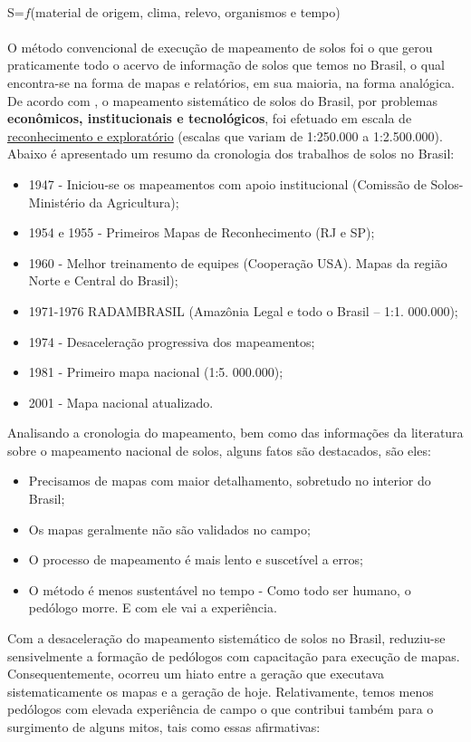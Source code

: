 \\
S=$f$(material de origem, clima, relevo, organismos e tempo)\\
\\
O método convencional de execução de mapeamento de solos foi o que gerou praticamente todo o acervo de informação de solos que temos no Brasil, o qual encontra-se na forma de mapas e relatórios, em sua maioria, na forma analógica.\\
De acordo com \cite{Mendonca-SantosEtAl:2007}, o mapeamento sistemático de solos do Brasil, por problemas \textbf{econômicos, institucionais e tecnológicos}, foi efetuado em escala de \underline{reconhecimento e exploratório} (escalas que variam de 1:250.000 a 1:2.500.000). Abaixo é apresentado um resumo da cronologia dos trabalhos de solos no Brasil:
\begin{itemize}
\item 1947 - Iniciou-se os mapeamentos com apoio institucional (Comissão de Solos- Ministério da Agricultura);
\item 1954 e 1955 - Primeiros Mapas de Reconhecimento (RJ e SP);
\item 1960 - Melhor treinamento de equipes (Cooperação USA). Mapas da região Norte e Central do Brasil);
\item 1971-1976 RADAMBRASIL (Amazônia Legal e todo o Brasil -- 1:1. 000.000);
\item 1974 - Desaceleração progressiva dos mapeamentos;
\item 1981 - Primeiro mapa nacional (1:5. 000.000);
\item 2001 - Mapa nacional atualizado.
\end{itemize}
Analisando a cronologia do mapeamento, bem como das informações da literatura sobre o mapeamento nacional de solos, alguns fatos são destacados, são eles: \begin{itemize}
\item Precisamos de mapas com maior detalhamento, sobretudo no interior do Brasil;
\item Os mapas geralmente não são validados no campo;
\item O processo de mapeamento é mais lento e suscetível a erros;
\item O método é menos sustentável no tempo - Como todo ser humano, o pedólogo morre. E com ele vai a experiência.
\end{itemize}
Com a desaceleração do mapeamento sistemático de solos no Brasil, reduziu-se sensivelmente a formação de pedólogos com capacitação para execução de mapas. Consequentemente, ocorreu um hiato entre a geração que executava sistematicamente os mapas e a geração de hoje. Relativamente, temos menos pedólogos com elevada experiência de campo o que contribui também para o surgimento de alguns mitos, tais como essas afirmativas:
